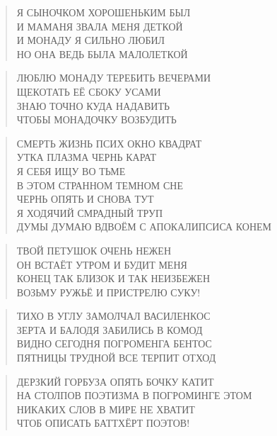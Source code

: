 \poemtitle{***}
\begin{verse}
Я СЫНОЧКОМ ХОРОШЕНЬКИМ БЫЛ\\
И МАМАНЯ ЗВАЛА МЕНЯ ДЕТКОЙ\\
И МОНАДУ Я СИЛЬНО ЛЮБИЛ\\
НО ОНА ВЕДЬ БЫЛА МАЛОЛЕТКОЙ
\end{verse}

\poemtitle{***}
\begin{verse}
ЛЮБЛЮ МОНАДУ ТЕРЕБИТЬ ВЕЧЕРАМИ\\
ЩЕКОТАТЬ ЕЁ СБОКУ УСАМИ\\
ЗНАЮ ТОЧНО КУДА НАДАВИТЬ\\
ЧТОБЫ МОНАДОЧКУ ВОЗБУДИТЬ
\end{verse}

\poemtitle{***}
\begin{verse}
СМЕРТЬ ЖИЗНЬ ПСИХ ОКНО КВАДРАТ\\
УТКА ПЛАЗМА ЧЕРНЬ КАРАТ\\
Я СЕБЯ ИЩУ ВО ТЬМЕ\\
В ЭТОМ СТРАННОМ ТЕМНОМ СНЕ\\
ЧЕРНЬ ОПЯТЬ И СНОВА ТУТ\\
Я ХОДЯЧИЙ СМРАДНЫЙ ТРУП\\
ДУМЫ ДУМАЮ ВДВОЁМ С АПОКАЛИПСИСА КОНЕМ
\end{verse}

\poemtitle{***}
\begin{verse}
ТВОЙ ПЕТУШОК ОЧЕНЬ НЕЖЕН\\
ОН ВСТАЁТ УТРОМ И БУДИТ МЕНЯ\\
КОНЕЦ ТАК БЛИЗОК И ТАК НЕИЗБЕЖЕН\\
ВОЗЬМУ РУЖЬЁ И ПРИСТРЕЛЮ СУКУ!
\end{verse}

\poemtitle{***}
\begin{verse}
ТИХО В УГЛУ ЗАМОЛЧАЛ ВАСИЛЕНКОС\\
ЗЕРТА И БАЛОДЯ ЗАБИЛИСЬ В КОМОД\\
ВИДНО СЕГОДНЯ ПОГРОМЕНГА БЕНТОС\\
ПЯТНИЦЫ ТРУДНОЙ ВСЕ ТЕРПИТ ОТХОД
\end{verse}

\poemtitle{***}
\begin{verse}
ДЕРЗКИЙ ГОРБУЗА ОПЯТЬ БОЧКУ КАТИТ\\
НА СТОЛПОВ ПОЭТИЗМА В ПОГРОМИНГЕ ЭТОМ\\
НИКАКИХ СЛОВ В МИРЕ НЕ ХВАТИТ\\
ЧТОБ ОПИСАТЬ БАТТХЁРТ ПОЭТОВ!
\end{verse}

